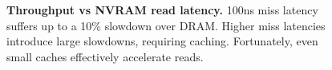 \begin{figure}
  \centering
  \caption{\textbf{Throughput vs NVRAM read latency.} 100ns miss latency suffers up to a 10\% slowdown over DRAM.  Higher miss latencies introduce large slowdowns, requiring caching.  Fortunately, even small caches effectively accelerate reads.}
  \label{fig::ReadPerformance}
\end{figure}
